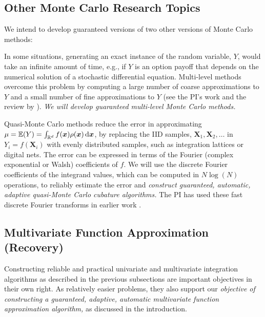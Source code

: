\documentclass[11pt]{NSFamsart}
\def\reals{{\mathbb{R}}}
\newcommand{\bbE}{\mathbb{E}}
\newcommand{\bx}{{\boldsymbol{x}}}
\newcommand{\bX}{{\boldsymbol{X}}}
\def\dif{\textup{d}}
\begin{document}
\begin{description}[leftmargin=2.5ex]
\subsection{Other Monte Carlo Research Topics} We intend to develop guaranteed versions of two other versions of Monte Carlo methods:
\begin{description}[leftmargin=2.5ex]
\item[Multi-Level Monte Carlo] In some situations, generating an exact instance of the random variable, $Y$, would take an infinite amount of time, e.g., if $Y$ is an option payoff that depends on the numerical solution of a stochastic differential equation.  Multi-level methods overcome this problem by computing a large number of coarse approximations to $Y$ and a small number of fine approximations to $Y$ (see the PI's work \citep{NiuHic09a, NiuHic09b} and the review by \cite{Gil14a}).  \emph{We will develop guaranteed multi-level Monte Carlo methods.}

\item[Quasi-Monte Carlo] Quasi-Monte Carlo methods \citep{DicEtal14a} reduce the error in approximating $\mu=\bbE(Y)=\int_{\reals^d} f(\bx) \rho(\bx) \, \dif \bx$, by replacing the IID samples, $\bX_1, \bX_2, \ldots$ in $Y_i=f(\bX_i)$ with evenly distributed samples, such as integration lattices or digital nets.  The error can be expressed in terms of the Fourier (complex exponential or Walsh) coefficients of $f$.  We will use the discrete Fourier coefficients of the integrand values, which can be computed in $N \log(N)$ operations, to reliably estimate the error and \emph{construct guaranteed, automatic, adaptive quasi-Monte Carlo cubature algorithms.} The PI has used these fast discrete Fourier transforms in earlier work \citep{LiHic03a,DicHicLiu07a}.

\end{description}

\subsection{Multivariate Function Approximation (Recovery)}\label{SecRecovery}
Constructing reliable and practical  univariate and multivariate integration algorithms as described in the previous subsections are important objectives in their own right.  As relatively easier problems, they also support our \emph{objective of constructing a guaranteed, adaptive, automatic multivariate function approximation algorithm,} as discussed in the introduction.


\end{description}
\end{document}
